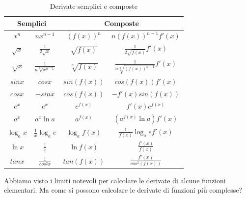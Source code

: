 \begin{table}[ht]
    \centering
    \begin{tabular}{|c|c||c|c|}
         \hline\multicolumn{2}{|c|}{\textbf{Semplici}} & \multicolumn{2}{|c|}{\textbf{Composte}}\\\hline\hline
         $x^{n}$ & $nx^{n-1}$ & $(f(x))^{n}$ & $n(f(x))^{n-1}f'(x)$\\\hline
         $\sqrt{x}$ & $\frac{1}{2\sqrt{x}}$ & $\sqrt{f(x)}$ & $\frac{1}{2\sqrt{f(x)}}f'(x)$\\\hline
         $\sqrt[n]{x}$ & $\frac{1}{n\sqrt[n]{x^{n-1}}}$ & $\sqrt[n]{f(x)}$ & $\frac{1}{n\sqrt[n]{(f(x))^{n-1}}}f'(x)$\\\hline
         $sinx$ & $cosx$ & $sin(f(x))$ & $cos(f(x))f'(x)$\\\hline
         $cosx$ & $-sinx$ & $cos(f(x))$ & $-f'(x)sin(f(x))$\\\hline
         $e^{x}$ & $e^{x}$ & $e^{f(x)}$ & $f'(x)e^{f(x)}$\\\hline
         $a^{x}$ & $a^{x}\ln{a}$ & $a^{f(x)}$ & $(a^{f(x)}\ln{a})f'(x)$\\\hline
         $\log_{a}{x}$ & $\frac{1}{x}\log_{a}{e}$ & $\log_{a}{f(x)}$ & $\frac{1}{f(x)}\log_{a}{e}f'(x)$\\\hline
         $\ln{x}$ & $\frac{1}{x}$ & $\ln{f(x)}$ & $\frac{f'(x)}{f(x)}$\\\hline
         $tanx$ & $\frac{1}{cos^{2}x}$ & $tan(f(x))$ & $\frac{f'(x)}{cos^{2}(f(x))}$\\\hline
    \end{tabular}
    \caption{Derivate semplici e composte}
    \label{tab:deriv_sem_e_comp}
\end{table}

Abbiamo visto i limiti notevoli per calcolare le derivate di alcune funzioni elementari. Ma come si possono calcolare le derivate di funzioni più complesse?

